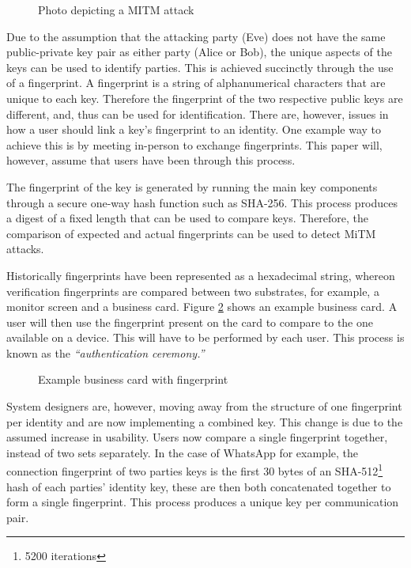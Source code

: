\begin{center}
    
    \begin{figure}[h]
        \caption{Photo depicting a MITM attack}
        \label{fig:mitm}
    \end{figure}
\end{center}

Due to the assumption that the attacking party (Eve) does not have the same public-private key pair as either party (Alice or Bob), the unique aspects of the keys can be used to identify parties. This is achieved succinctly through the use of a fingerprint. A fingerprint is a string of alphanumerical characters that are unique to each key. Therefore the fingerprint of the two respective public keys are different, and, thus can be used for identification. There are, however, issues in how a user should link a key's fingerprint to an identity. One example way to achieve this is by meeting in-person to exchange fingerprints. This paper will, however, assume that users have been through this process.

The fingerprint of the key is generated by running the main key components through a secure one-way hash function such as SHA-256. This process produces a digest of a fixed length that can be used to compare keys. Therefore, the comparison of expected and actual fingerprints can be used to detect MiTM attacks.

Historically fingerprints have been represented as a hexadecimal string, whereon verification fingerprints are compared between two substrates, for example, a monitor screen and a business card. Figure \ref{fig:businessCard} shows an example business card. A user will then use the fingerprint present on the card to compare to the one available on a device. This will have to be performed by each user. This process is known as the \textit{``authentication ceremony.''} 

\begin{figure}[h!]
    \centering
    \fbox{
        
    }
    \caption{Example business card with fingerprint}
    \label{fig:businessCard}
\end{figure}

System designers are, however, moving away from the structure of one fingerprint per identity and are now implementing a combined key. This change is due to the assumed increase in usability. Users now compare a single fingerprint together, instead of two sets separately. In the case of WhatsApp for example, the connection fingerprint of two parties keys is the first 30 bytes of an SHA-512\footnote{5200 iterations} hash of each parties' identity key, these are then both concatenated together to form a single fingerprint\cite{whatsapp2017paper}. This process produces a unique key per communication pair.


